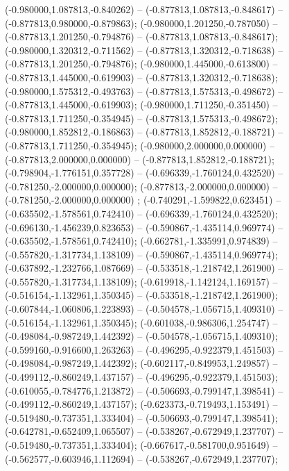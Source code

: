  (-0.980000,1.087813,-0.840262) -- (-0.877813,1.087813,-0.848617) -- (-0.877813,0.980000,-0.879863);
 (-0.980000,1.201250,-0.787050) -- (-0.877813,1.201250,-0.794876) -- (-0.877813,1.087813,-0.848617);
 (-0.980000,1.320312,-0.711562) -- (-0.877813,1.320312,-0.718638) -- (-0.877813,1.201250,-0.794876);
 (-0.980000,1.445000,-0.613800) -- (-0.877813,1.445000,-0.619903) -- (-0.877813,1.320312,-0.718638);
 (-0.980000,1.575312,-0.493763) -- (-0.877813,1.575313,-0.498672) -- (-0.877813,1.445000,-0.619903);
 (-0.980000,1.711250,-0.351450) -- (-0.877813,1.711250,-0.354945) -- (-0.877813,1.575313,-0.498672);
 (-0.980000,1.852812,-0.186863) -- (-0.877813,1.852812,-0.188721) -- (-0.877813,1.711250,-0.354945);
 (-0.980000,2.000000,0.000000) -- (-0.877813,2.000000,0.000000) -- (-0.877813,1.852812,-0.188721);
 (-0.798904,-1.776151,0.357728) -- (-0.696339,-1.760124,0.432520) -- (-0.781250,-2.000000,0.000000);
 (-0.877813,-2.000000,0.000000) -- (-0.781250,-2.000000,0.000000) ;
 (-0.740291,-1.599822,0.623451) -- (-0.635502,-1.578561,0.742410) -- (-0.696339,-1.760124,0.432520);
 (-0.696130,-1.456239,0.823653) -- (-0.590867,-1.435114,0.969774) -- (-0.635502,-1.578561,0.742410);
 (-0.662781,-1.335991,0.974839) -- (-0.557820,-1.317734,1.138109) -- (-0.590867,-1.435114,0.969774);
 (-0.637892,-1.232766,1.087669) -- (-0.533518,-1.218742,1.261900) -- (-0.557820,-1.317734,1.138109);
 (-0.619918,-1.142124,1.169157) -- (-0.516154,-1.132961,1.350345) -- (-0.533518,-1.218742,1.261900);
 (-0.607844,-1.060806,1.223893) -- (-0.504578,-1.056715,1.409310) -- (-0.516154,-1.132961,1.350345);
 (-0.601038,-0.986306,1.254747) -- (-0.498084,-0.987249,1.442392) -- (-0.504578,-1.056715,1.409310);
 (-0.599160,-0.916600,1.263263) -- (-0.496295,-0.922379,1.451503) -- (-0.498084,-0.987249,1.442392);
 (-0.602117,-0.849953,1.249857) -- (-0.499112,-0.860249,1.437157) -- (-0.496295,-0.922379,1.451503);
 (-0.610055,-0.784776,1.213872) -- (-0.506693,-0.799147,1.398541) -- (-0.499112,-0.860249,1.437157);
 (-0.623373,-0.719493,1.153491) -- (-0.519480,-0.737351,1.333404) -- (-0.506693,-0.799147,1.398541);
 (-0.642781,-0.652409,1.065507) -- (-0.538267,-0.672949,1.237707) -- (-0.519480,-0.737351,1.333404);
 (-0.667617,-0.581700,0.951649) -- (-0.562577,-0.603946,1.112694) -- (-0.538267,-0.672949,1.237707);
